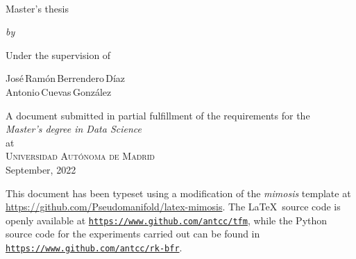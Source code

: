 
\begin{titlepage}
  \vspace*{5cm}
  \makeatletter
  \begin{center}
    \begin{singlespace*}
    \begin{Huge}
      \@title
    \end{Huge}\\[1cm]
    \begin{large}
      Master's thesis
    \end{large}
    \vskip 0.1cm
    \emph{by}
    \vskip 0.18cm
    \begin{Large}
    \textsc{\@author}
  \end{Large}
  \end{singlespace*}
    \vfill

    Under the supervision of
    \begin{large}
    \vskip 0.1cm
    José\,Ramón\,Berrendero\,Díaz\\
    Antonio\,Cuevas\,González\\[1cm]
  \end{large}

    A document submitted in partial fulfillment
    of the requirements for the\\
    \emph{Master's degree in Data Science}\\
    at\\
    \textsc{Universidad Autónoma de Madrid}\\[1cm]

    September, 2022
  \end{center}
  \makeatother
\end{titlepage}
\newpage





\thispagestyle{empty}
\pagebreak
\hspace{0pt}
\vfill
\begin{center}
    \begin{minipage}[t]{12.5cm}
        \doclicenseThis
        This document has been typeset using a modification of the \textit{mimosis} template at \url{https://github.com/Pseudomanifold/latex-mimosis}. The \LaTeX\ source code is openly available at \texttt{\url{https://www.github.com/antcc/tfm}}, while the Python source code for the experiments carried out can be found in \texttt{\url{https://www.github.com/antcc/rk-bfr}}.
    \end{minipage}
\end{center}
\vfill
\hspace{0pt}
\pagebreak
\newpage

